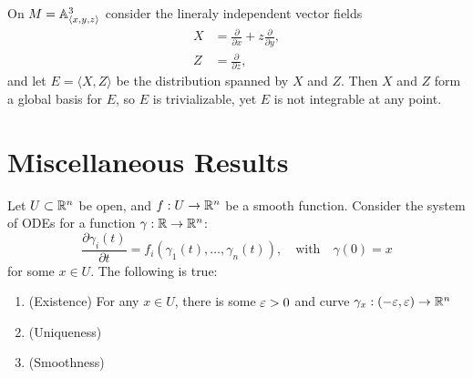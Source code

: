 \documentclass{lkx_paper}
\begin{document}

\begin{example}
	On $M= \mathbb{A}^3_{\langle x,y,z\rangle}$ consider the lineraly independent vector fields
	\[
		\begin{aligned}
			X & = \frac{\partial}{\partial x} + z\frac{\partial}{\partial y}, \\
			Z & = \frac{\partial}{\partial z},
		\end{aligned}
	\]
	and let $E=\langle X, Z \rangle$ be the distribution spanned by $X$ and $Z$. Then $X$ and $Z$ form a global basis for $E$, so $E$ is trivializable, yet $E$ is not integrable at any point.

\end{example}

\section{Miscellaneous Results}

\begin{theorem}
	Let $U\subset \mathbb{R}^n$ be open, and $f : U \to \mathbb{R}^n$ be a smooth function. Consider the system of ODEs for a function $\gamma : \mathbb{R} \to \mathbb{R}^n$:
	\[
		\frac{\partial \gamma_i(t)}{\partial t} = f_i(\gamma_1(t), \ldots, \gamma_n(t)),\quad\textrm{with}\quad \gamma(0)=x
	\]
	for some $x\in U$. The following is true:
	\begin{enumerate}
		\item (Existence) For any $x\in U$, there is some $\varepsilon > 0$ and curve $\gamma_x : (-\varepsilon, \varepsilon) \to \mathbb{R}^n$
		\item (Uniqueness)
		\item (Smoothness)
	\end{enumerate}
\end{theorem}
\end{document}
